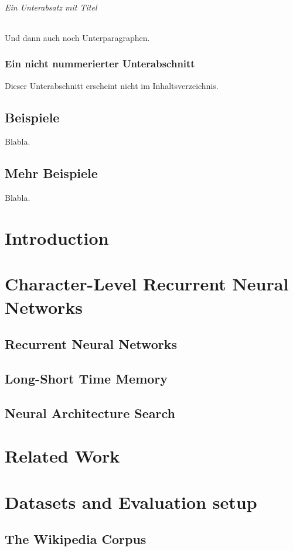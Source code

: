 \documentclass[11pt,a4paper,twoside,openright]{scrbook}
\begin{document}
\subparagraph{Ein Unterabsatz mit Titel}
Und dann auch noch Unterparagraphen.

\subsection*{Ein nicht nummerierter Unterabschnitt}
Dieser Unterabschnitt erscheint nicht im Inhaltsverzeichnis.
\newpage

\section{Beispiele}
Blabla.
\newpage

\section{Mehr Beispiele}
Blabla.
\newpage

\chapter{Introduction}
\cite{irbook}

\chapter{Character-Level Recurrent Neural Networks}
\section{Recurrent Neural Networks}
\section{Long-Short Time Memory}
\section{Neural Architecture Search}

\chapter{Related Work}

\chapter{Datasets and Evaluation setup}
\section{The Wikipedia Corpus}
\end{document}
